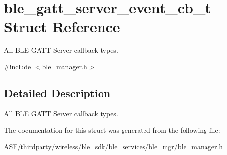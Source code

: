 \hypertarget{structble__gatt__server__event__cb__t}{}\section{ble\+\_\+gatt\+\_\+server\+\_\+event\+\_\+cb\+\_\+t Struct Reference}
\label{structble__gatt__server__event__cb__t}


All B\+LE G\+A\+TT Server callback types.  




{\ttfamily \#include $<$ble\+\_\+manager.\+h$>$}



\subsection{Detailed Description}
All B\+LE G\+A\+TT Server callback types. 

The documentation for this struct was generated from the following file\+:\begin{DoxyCompactItemize}
\item 
A\+S\+F/thirdparty/wireless/ble\+\_\+sdk/ble\+\_\+services/ble\+\_\+mgr/\mbox{\hyperlink{ble__manager_8h}{ble\+\_\+manager.\+h}}\end{DoxyCompactItemize}
